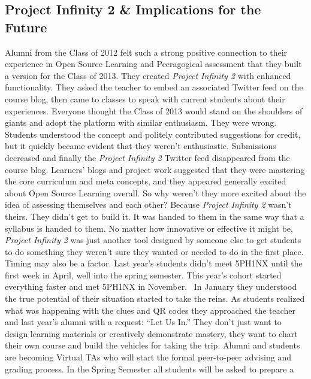 \hypertarget{project-infinity-2-implications-for-the-future}{%
\subsection{Project Infinity 2 \& Implications for the
Future}\label{project-infinity-2-implications-for-the-future}}

Alumni from the Class of 2012 felt such a strong positive connection to
their experience in Open Source Learning and Peeragogical assessment
that they built a version for the Class of 2013. They created
\emph{Project Infinity 2} with enhanced functionality. They asked the
teacher to embed an associated Twitter feed on the course blog, then
came to classes to speak with current students about their experiences.
Everyone thought the Class of 2013 would stand on the shoulders of
giants and adopt the platform with similar enthusiasm. They were wrong.
Students understood the concept and politely contributed suggestions for
credit, but it quickly became evident that they weren't enthusiastic.
Submissions decreased and finally the \emph{Project Infinity 2} Twitter
feed disappeared from the course blog. Learners' blogs and project work
suggested that they were mastering the core curriculum and meta
concepts, and they appeared generally excited about Open Source Learning
overall. So why weren't they more excited about the idea of assessing
themselves and each other? Because \emph{Project Infinity 2} wasn't
theirs. They didn't get to build it. It was handed to them in the same
way that a syllabus is handed to them. No matter how innovative or
effective it might be, \emph{Project Infinity 2} was just another tool
designed by someone else to get students to do something they weren't
sure they wanted or needed to do in the first place. Timing may also be
a factor. Last year's students didn't meet 5PH1NX until the first week
in April, well into the spring semester. This year's cohort started
everything faster and met 5PH1NX in November.~ In January they
understood the true potential of their situation started to take the
reins. As students realized what was happening with the clues and QR
codes they approached the teacher and last year's alumni with a request:
``Let Us In.'' They don't just want to design learning materials or
creatively demonstrate mastery, they want to chart their own course and
build the vehicles for taking the trip. Alumni and students are becoming
Virtual TAs who will start the formal peer-to-peer advising and grading
process. In the Spring Semester all students will be asked to prepare a
